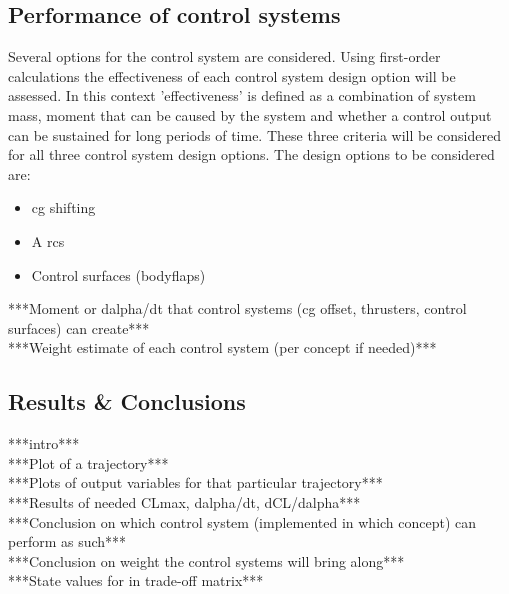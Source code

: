 \subsection{Performance of control systems}
 \label{sec:astroref}
Several options for the control system are considered. Using first-order calculations the effectiveness of each control system design option will be assessed. In this context 'effectiveness' is defined as a combination of system mass, moment that can be caused by the system and whether a control output can be sustained for long periods of time. These three criteria will be considered for all three control system design options. The design options to be considered are:
\begin{itemize}
	\item \acrfull{cg} shifting
	\item A \acrfull{rcs}
	\item Control surfaces (bodyflaps)
\end{itemize}
***Moment or dalpha/dt that control systems (cg offset, thrusters, control surfaces) can create***\\
***Weight estimate of each control system (per concept if needed)***\\

\subsection{Results \& Conclusions}
\label{sec:astrores}
***intro***\\
***Plot of a trajectory***\\
***Plots of output variables for that particular trajectory***\\
***Results of needed CLmax, dalpha/dt, dCL/dalpha***\\
***Conclusion on which control system (implemented in which concept) can perform as such***\\
***Conclusion on weight the control systems will bring along***\\
***State values for in trade-off matrix***\\
